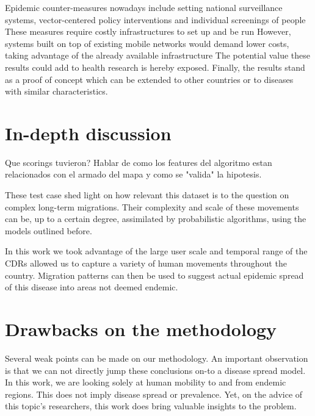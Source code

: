 


Epidemic counter-measures nowadays include setting national surveillance systems, vector-centered policy interventions and individual screenings of people
These measures require costly infrastructures to set up and be run
However, systems built on top of existing mobile networks would demand lower costs, taking advantage of the already available infrastructure
The potential value these results could add to health research is hereby exposed.
Finally, the results stand as a proof of concept which can be extended to other countries or to diseases with similar characteristics.



\section{In-depth discussion}


Que scorings tuvieron?
Hablar de como los features del algoritmo estan relacionados con el armado del mapa y como se "valida" la hipotesis.





These test case shed light on how relevant this dataset is to the question on complex long-term migrations.
Their complexity and scale of these movements can be, up to a certain degree, assimilated by probabilistic algorithms, using the models outlined before.


In this work we took advantage of the large user scale and temporal range of the CDRs allowed us to capture a variety of human movements throughout the country.
Migration patterns can then be used to suggest actual epidemic spread of this disease into areas not deemed endemic.




\section{Drawbacks on the methodology}

Several weak points can be made on our methodology.
An important observation is that we can not directly jump these conclusions on-to a disease spread model.
In this work, we are looking solely at human mobility to and from endemic regions.
This does not imply disease spread or prevalence.
Yet, on the advice of this topic's researchers, this work does bring valuable insights to the problem.



